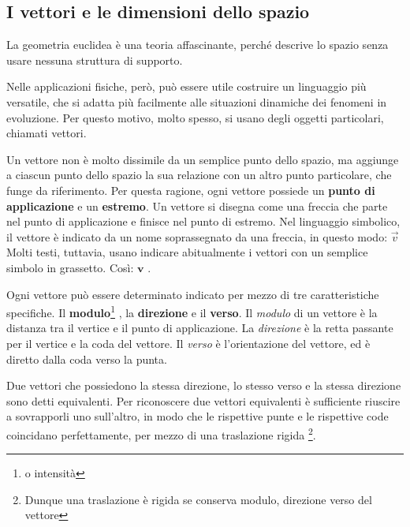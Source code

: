 \subsection*{I vettori e le dimensioni dello spazio}
La geometria euclidea è una teoria affascinante, perché descrive lo spazio senza usare nessuna struttura di supporto.

Nelle applicazioni fisiche, però, può essere utile costruire un linguaggio più versatile, che si adatta più facilmente alle situazioni dinamiche dei fenomeni in evoluzione. Per questo motivo, molto spesso, si usano degli oggetti particolari, chiamati vettori.
\newline

Un vettore non è molto dissimile da un semplice punto dello spazio, ma aggiunge a ciascun punto dello spazio la sua relazione con un altro punto particolare, che funge da riferimento. Per questa ragione, ogni vettore possiede un {\bfseries punto di applicazione} e un {\bfseries estremo}. Un vettore si disegna come una freccia che parte nel punto di applicazione e finisce nel punto di estremo.\newline
Nel linguaggio simbolico, il vettore è indicato da un nome soprassegnato da una freccia, in questo modo: $\vec{v}$\newline
Molti testi, tuttavia, usano indicare abitualmente i vettori con un semplice simbolo in grassetto. Così: $ \mathbf{v}$ .
\newline

Ogni vettore può essere determinato indicato per mezzo di tre caratteristiche specifiche. Il {\bfseries modulo}\footnote {o intensità} , la {\bfseries direzione} e il {\bfseries verso}.\newline
Il {\slshape modulo} di un vettore è la distanza tra il vertice e il punto di applicazione.\newline
La {\slshape direzione} è la retta passante per il vertice e la coda del vettore.\newline
Il {\slshape verso} è l'orientazione del vettore, ed è diretto dalla coda verso la punta.
\newline

Due vettori che possiedono la stessa direzione, lo stesso verso e la stessa direzione sono detti equivalenti. Per riconoscere due vettori equivalenti è sufficiente riuscire a sovrapporli uno sull'altro, in modo che le rispettive punte e le rispettive code coincidano perfettamente, per mezzo di una traslazione rigida \footnote {Dunque una traslazione è rigida se conserva modulo, direzione verso del vettore}.
\newline


